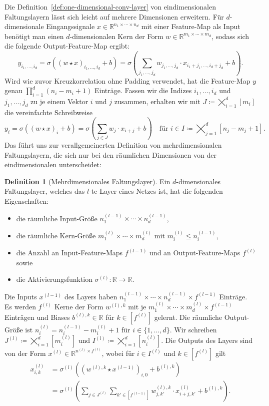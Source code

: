 \documentclass[paper=a4, 	%
		fontsize=11pt,
		abstract=true, 	%
		headsepline, 	%
		notitlepage	%
		]{scrartcl}
\theoremstyle{definition}
\newtheorem{definition}[theorem]{Definition}
\newcommand{\R}{\mathbb{R}}
\newcommand{\fNat}[1]{[ #1 ]}
\begin{document}
Die Definition~\ref{def:one-dimensional-conv-layer} von eindimensionalen Faltungslayern lässt sich leicht auf mehrere Dimensionen erweitern.
Für $d$-dimensionale Eingangssignale $x\in\R^{n_1\times \cdots \times n_d}$ mit einer Feature-Map als Input benötigt man einen $d$-dimensionalen Kern der Form $w\in\R^{m_1\times\cdots\times m_d}$, sodass sich die folgende Output-Feature-Map ergibt:
\[
    y_{i_1,\dots,i_d} = \sigma\left((w\star x)_{i_1,\dots,i_d} + b\right)
    = \sigma\left( \sum_{j_1,\dots,j_d} w_{j_1,\dots,j_d} \cdot x_{i_1+j_1,\dots,i_d+j_d} + b \right).
\]
Wird wie zuvor Kreuzkorrelation ohne Padding verwendet, hat die Feature-Map $y$ genau $\prod_{i=1}^d (n_i - m_i +1)$ Einträge.
Fassen wir die Indizes $i_1,\dots,i_d$ und $j_1,\dots,j_d$ zu je einem Vektor $i$ und $j$ zusammen, erhalten wir mit $J\coloneqq \bigtimes_{i=1}^d [m_i]$ die vereinfachte Schreibweise
\[
    y_{i} = \sigma\left((w\star x)_{i} + b\right)
    = \sigma\left( \sum_{j \in J} w_j \cdot x_{i+j} + b \right) \quad \text{für $i\in I\coloneqq \bigtimes_{j=1}^d [n_j - m_j +1]$}.
\]
Das führt uns zur verallgemeinerten Definition von mehrdimensionalen Faltungslayern, die sich nur bei den räumlichen Dimensionen von der eindimensionalen unterscheidet:

\begin{definition}[Mehrdimensionales Faltungslayer]\label{def:multi-dimensional-conv-layer}
    Ein $d$-dimensionales Faltungslayer, welches das $l$-te Layer eines Netzes ist, hat die folgenden Eigenschaften:
    \begin{itemize}
        \item die räumliche Input-Größe $n^{(l-1)}_1\times\cdots\times n^{(l-1)}_d$,
        \item die räumliche Kern-Größe $m^{(l)}_1\times \cdots \times m^{(l)}_d$ mit $m^{(l)}_i \leq n^{(l-1)}_i$, 
        \item die Anzahl an Input-Feature-Maps $f^{(l-1)}$ und an Output-Feature-Maps $f^{(l)}$ sowie
        \item die Aktivierungsfunktion $\sigma^{(l)}: \R \rightarrow \R$.
    \end{itemize}
    Die Inputs $x^{(l-1)}$ des Layers haben $n^{(l-1)}_1\times\cdots\times n^{(l-1)}_d \times f^{(l-1)}$ Einträge.
    Es werden $f^{(l)}$ Kerne der Form $w^{(l),k}$ mit je $m^{(l)}_1\times\cdots\times m^{(l)}_d \times f^{(l-1)}$ Einträgen und Biases $b^{(l),k}\in\R$ für  $k\in \fNat{f^{(l)}}$ gelernt.
    Die räumliche Output-Größe ist $n^{(l)}_i = n^{(l-1)}_i-  m^{(l)}_i + 1$ für $i\in\{1,\dots, d\}$.
    Wir schreiben $J^{(l)} \coloneqq \bigtimes_{i=1}^d [m^{(l)}_i]$ und $I^{(l)} \coloneqq \bigtimes_{i=1}^d [n^{(l)}_i]$.
    Die Outputs des Layers sind von der Form $x^{(l)}\in \R^{n^{(l)}\times f^{(l)}}$, wobei für $i\in I^{(l)}$ und $k\in\fNat{f^{(l)}}$ gilt
    \begin{align*}
        x^{(l)}_{i,k}
        &=  \sigma^{(l)}\left( (w^{(l),k} \star x^{(l-1)})_{i,0} + b^{(l),k} \right)\\
        &= \sigma^{(l)} \left( 
            \sum_{j \in J^{(l)}} \sum_{k'\in \fNat{f^{(l-1)}}}
            w^{(l),k}_{j,k'} \cdot x^{(l)}_{i+j, k'} + b^{(l), k}
        \right).
    \end{align*}
\end{definition}
\end{document}
